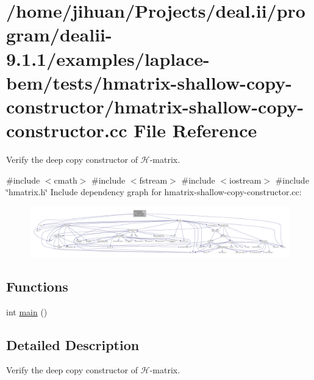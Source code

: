 \hypertarget{hmatrix-shallow-copy-constructor_8cc}{}\section{/home/jihuan/\+Projects/deal.ii/program/dealii-\/9.1.1/examples/laplace-\/bem/tests/hmatrix-\/shallow-\/copy-\/constructor/hmatrix-\/shallow-\/copy-\/constructor.cc File Reference}
\label{hmatrix-shallow-copy-constructor_8cc}


Verify the deep copy constructor of $\mathcal{H}$-\/matrix.  


{\ttfamily \#include $<$cmath$>$}\newline
{\ttfamily \#include $<$fstream$>$}\newline
{\ttfamily \#include $<$iostream$>$}\newline
{\ttfamily \#include \char`\"{}hmatrix.\+h\char`\"{}}\newline
Include dependency graph for hmatrix-\/shallow-\/copy-\/constructor.cc\+:\nopagebreak
\begin{figure}[H]
\begin{center}
\leavevmode
\includegraphics[width=350pt]{hmatrix-shallow-copy-constructor_8cc__incl}
\end{center}
\end{figure}
\subsection*{Functions}
\begin{DoxyCompactItemize}
\item 
int \hyperlink{hmatrix-shallow-copy-constructor_8cc_ae66f6b31b5ad750f1fe042a706a4e3d4}{main} ()
\end{DoxyCompactItemize}


\subsection{Detailed Description}
Verify the deep copy constructor of $\mathcal{H}$-\/matrix. 

